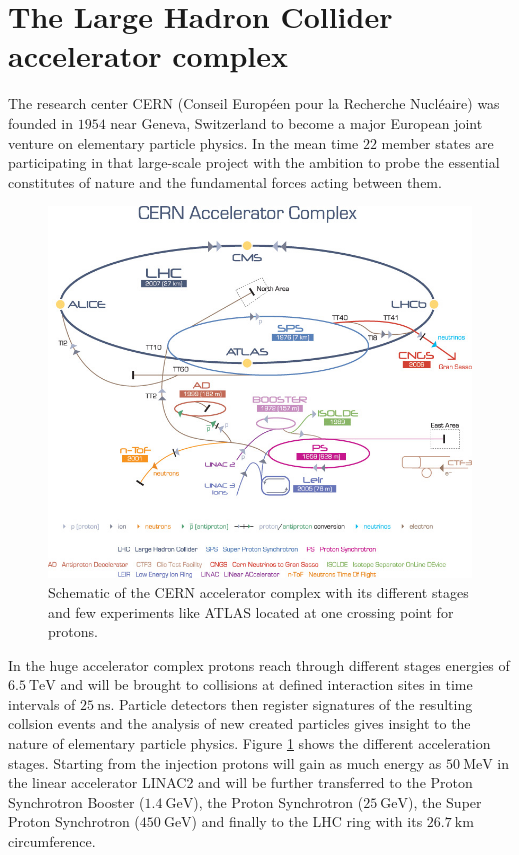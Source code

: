 \section{The Large Hadron Collider accelerator complex}\label{LHC}
The research center CERN (Conseil Européen pour la Recherche Nucléaire) was founded in $1954$ near Geneva, Switzerland to become a major European joint venture on elementary particle physics. In the mean time $22$ member states are participating in that large-scale project with the ambition to probe the essential constitutes of nature and the fundamental forces acting between them. \cite{CERNabout}\par
%
\begin{figure}[htbp]                                 
 \begin{center}                                       
  \includegraphics[width=0.55\linewidth]{figures/CERNKomplex.jpg} 
   \caption[Schematic of the CERN accelerator complex.]{Schematic of the CERN accelerator complex with its different stages and few experiments like ATLAS located at one crossing point for protons. \cite{CERNKomplex}}
  \label{complex}                                     
 \end{center}
\end{figure}
%
In the huge accelerator complex protons reach through different stages energies of $\SI{6.5}{\tera\electronvolt}$ and will be brought to collisions at defined interaction sites in time intervals of $\SI{25}{\nano\second}$. Particle detectors then register signatures of the resulting collsion events and the analysis of new created particles gives insight to the nature of elementary particle physics.\newline 
Figure \ref{complex} shows the different acceleration stages. Starting from the injection protons will gain as much energy as $\SI{50}{\mega\electronvolt}$ in the linear accelerator LINAC2 and will be further transferred to the Proton Synchrotron Booster ($\SI{1.4}{\giga\electronvolt}$), the Proton Synchrotron ($\SI{25}{\giga\electronvolt}$), the Super Proton Synchrotron ($\SI{450}{\giga\electronvolt}$) and finally to the LHC ring with its $\SI{26.7}{\kilo\meter}$ circumference. \cite{CERNabout}\newline
